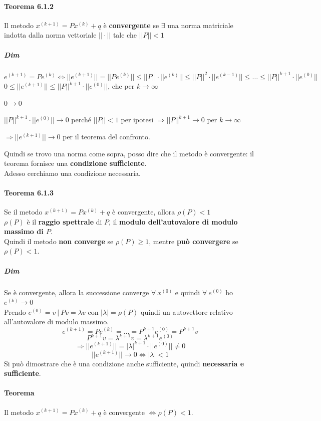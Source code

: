 \documentclass[10pt]{book}
\begin{document}
\paragraph{Teorema 6.1.2} Il metodo $x^{(k+1)} = Px^{(k)} + q$ è \textbf{convergente} se $\exists$ una norma matriciale indotta dalla norma vettoriale $||\cdot||$ tale che $||P|| < 1$
\subparagraph{Dim} $e^{(k + 1)} = Pe^{(k)} \Leftrightarrow ||e^{(k + 1)}|| = ||Pe^{(k)}|| \leq ||P||\cdot||e^{(k)}|| \leq ||P||^2\cdot||e^{(k-1)}|| \leq \ldots \leq ||P||^{k+1}\cdot||e^{(0)}||$\\
$0 \leq ||e^{(k+1)}|| \leq ||P||^{k+1}\cdot||e^{(0)}||$, che per $k\to\infty$
\begin{list}{}{}
	\item $0\to 0$
	\item $||P||^{k+1}\cdot||e^{(0)}||\to 0$ perché $||P|| < 1$ per ipotesi $\Rightarrow||P||^{k+1}\to 0$ per $k\to\infty$
	\item $\Rightarrow||e^{(k+1)}||\to 0$ per il teorema del confronto.
\end{list}
Quindi se trovo una norma come sopra, posso dire che il metodo è convergente: il teorema fornisce una \textbf{condizione sufficiente}.\\
Adesso cerchiamo una condizione necessaria.
\paragraph{Teorema 6.1.3} Se il metodo $x^{(k+1)} = Px^{(k)} + q$ è convergente, allora $\rho(P) < 1$\\
$\rho(P)$ è il \textbf{raggio spettrale} di $P$, il \textbf{modulo dell'autovalore di modulo massimo di $P$}.\\
Quindi il metodo \textbf{non converge} se $\rho(P) \geq 1$, mentre \textbf{può convergere} se $\rho(P) < 1$.
\subparagraph{Dim} Se è convergente, allora la successione converge $\forall\: x^{(0)}$ e quindi $\forall\:e^{(0)}$ ho $e^{(k)}\to 0$\\
Prendo $e^{(0)} = v\:|\: Pv = \lambda v$ con $|\lambda| = \rho(P)$ quindi un autovettore relativo all'autovalore di modulo massimo.
$$e^{(k+1)} = Pe^{(k)} = \ldots = P^{k+1}e^{(0)} = P^{k+1}v$$
$$P^{k+1}v = \lambda^{k+1}v = \lambda^{k+1}e^{(0)}$$
$$\Rightarrow||e^{(k+1)}|| = |\lambda|^{k+1}\cdot||e^{(0)}|| \neq 0$$
$$||e^{(k+1)}||\to 0 \Leftrightarrow |\lambda| < 1$$
Si può dimostrare che è una condizione anche sufficiente, quindi \textbf{necessaria e sufficiente}.
\paragraph{Teorema} Il metodo $x^{(k+1)} = Px^{(k)} + q$ è convergente $\Leftrightarrow \rho(P) < 1$.
\end{document}
